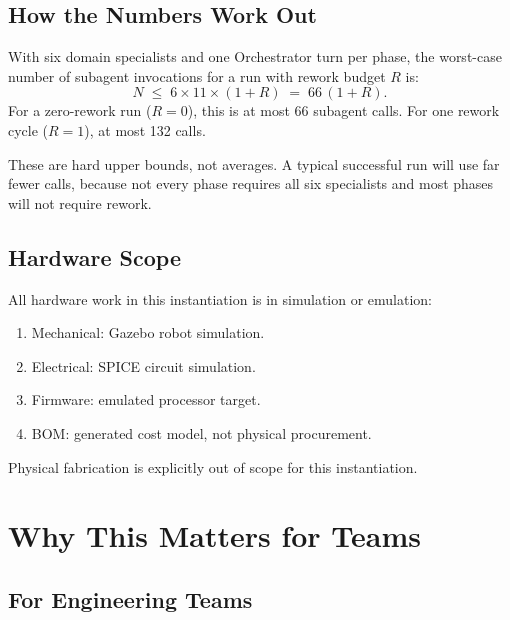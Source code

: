 \documentclass[12pt]{article}
\begin{document}
\subsection{How the Numbers Work Out}

With six domain specialists and one Orchestrator turn per phase,
the worst-case number of subagent invocations for a run with
rework budget $R$ is:
\[
N \;\leq\; 6 \times 11 \times (1 + R) \;=\; 66\,(1 + R).
\]
For a zero-rework run ($R = 0$), this is at most 66 subagent calls.
For one rework cycle ($R = 1$), at most 132 calls.

These are hard upper bounds, not averages.
A typical successful run will use far fewer calls, because not every
phase requires all six specialists and most phases will not require
rework.

\subsection{Hardware Scope}

All hardware work in this instantiation is in simulation or emulation:
\begin{enumerate}
    \item Mechanical: Gazebo robot simulation.
    \item Electrical: SPICE circuit simulation.
    \item Firmware: emulated processor target.
    \item BOM: generated cost model, not physical procurement.
\end{enumerate}
Physical fabrication is explicitly out of scope for this
instantiation.

\section{Why This Matters for Teams}
\label{sec:teams}

\subsection{For Engineering Teams}
\end{document}
